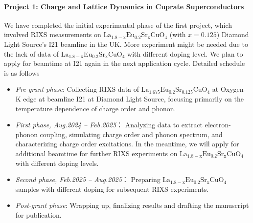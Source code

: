 \documentclass[11pt]{article}
\begin{document}
\paragraph{Project 1: Charge and Lattice Dynamics in Cuprate Superconductors}
We have completed the initial experimental phase of the first project, which involved RIXS measurements on $\mathrm{La_{1.8-x}Eu_{0.2}Sr_xCuO_{4}}$ (with $x=0.125$) Diamond Light Source's I21 beamline in the UK. More experiment might be needed due to the lack of data of $\mathrm{La_{1.8-x}Eu_{0.2}Sr_xCuO_{4}}$ with different doping level. We plan to apply for beamtime at I21 again in the next application cycle. Detailed schedule is as follows
\begin{itemize}
  \item \textit{Pre-grant phase}: Collecting RIXS data of $\mathrm{La_{1.675}Eu_{0.2}Sr_{0.125}CuO_{4}}$ at Oxygen-K edge at beamline I21 at Diamond Light Source, focusing primarily on the temperature dependence of charge order and phonon. 
  \item \textit{First phase, Aug.2024 -- Feb.2025}： Analyzing data to extract electron-phonon coupling, simulating charge order and phonon spectrum, and characterizing charge order excitations. In the meantime, we will apply for additional beamtime for further RIXS experiments on $\mathrm{La_{1.8-x}Eu_{0.2}Sr_xCuO_{4}}$ with different doping levels. 
  \item \textit{Second phase, Feb.2025 -- Aug.2025}： Preparing $\mathrm{La_{1.8-x}Eu_{0.2}Sr_xCuO_{4}}$ samples with different doping for subsequent RIXS experiments. 
  \item \textit{Post-grant phase}: Wrapping up,  finalizing results and drafting the manuscript for publication.
\end{itemize}
\end{document}
